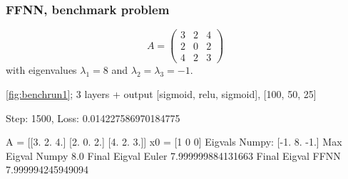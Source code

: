 \subsubsection{FFNN, benchmark problem}

\begin{equation*}
    A = \left(\begin{array}{ccc}
        3 & 2 & 4  \\
        2 & 0 & 2  \\
        4 & 2 & 3
    \end{array}\right)
\end{equation*}
with eigenvalues $\lambda_1 = 8$ and $\lambda_2 = \lambda_3 = -1$.



\autoref{fig:benchrun1}; 3 layers + output [sigmoid, relu, sigmoid], [100, 50, 25]

Step: 1500, Loss: 0.014227586970184775

A = [[3. 2. 4.]
 [2. 0. 2.]
 [4. 2. 3.]]
x0 = [1 0 0]
Eigvals Numpy: [-1.  8. -1.]
Max Eigval Numpy 8.0
Final Eigval Euler 7.999999884131663
Final Eigval FFNN 7.999994245949094

